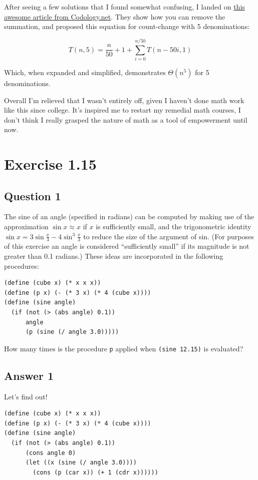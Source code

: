 \documentclass[final,fleqn,titlepage]{article}
\begin{document}
After seeing a few solutions that I found somewhat confusing, I landed on \href{https://codology.net/post/sicp-solution-exercise-1-14/}{this
awesome article from Codology.net}. They show how you can remove the summation,
and proposed this equation for count-change with 5 denominations:

\[
T(n,5)=\frac n{50}+1+\sum_{i=0}^{n/50}T(n-50i,1)
\]

Which, when expanded and simplified, demonstrates \(\Theta(n^{5})\) for 5
denominations.

Overall I'm relieved that I wasn't entirely off, given I haven't done math work
like this since college. It's inspired me to restart my remedial math courses, I
don't think I really grasped the nature of math as a tool of empowerment until
now.

\section{Exercise 1.15}
\label{sec:org03c471d}
\subsection{Question 1}
\label{sec:org77bdd26}
The sine of an angle (specified in radians) can be computed by making use of the
approximation \(\sin x ≈ x\) if \(x\) is sufficiently small, and the
trigonometric identity \(\sin x = 3\sin\frac{x}{3} − 4\sin^3\frac{x}{3}\)
to reduce the size of the argument of sin. (For purposes of this exercise an
angle is considered “sufficiently small” if its magnitude is not greater than
0.1 radians.) These ideas are incorporated in the following procedures:

\begin{verbatim}
(define (cube x) (* x x x))
(define (p x) (- (* 3 x) (* 4 (cube x))))
(define (sine angle)
  (if (not (> (abs angle) 0.1))
      angle
      (p (sine (/ angle 3.0)))))
\end{verbatim}

How many times is the procedure \texttt{p} applied when \texttt{(sine 12.15)} is evaluated?

\subsection{Answer 1}
\label{sec:org22a037a}

Let's find out!
\begin{verbatim}
(define (cube x) (* x x x))
(define (p x) (- (* 3 x) (* 4 (cube x))))
(define (sine angle)
  (if (not (> (abs angle) 0.1))
      (cons angle 0)
      (let ((x (sine (/ angle 3.0))))
        (cons (p (car x)) (+ 1 (cdr x))))))
\end{verbatim}
\end{document}
